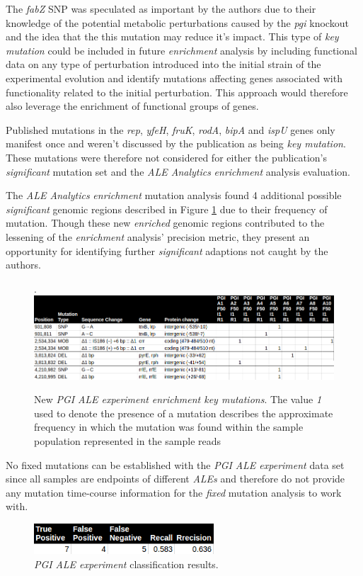 \documentclass[12pt,final,masters,chapterheads]{ucsd}  %
\begin{document}
The \textit{fabZ} SNP was speculated as important by the authors due to their knowledge of the potential metabolic perturbations caused by the \textit{pgi} knockout and the idea that the this mutation may reduce it's impact. This type of \textit{key mutation} could be included in future \textit{enrichment} analysis by including functional data on any type of perturbation introduced into the initial strain of the experimental evolution and identify mutations affecting genes associated with functionality related to the initial perturbation. This approach would therefore also leverage the enrichment of functional groups of genes.

Published mutations in the \textit{rep}, \textit{yfeH}, \textit{fruK}, \textit{rodA}, \textit{bipA} and \textit{ispU} genes only manifest once and weren't discussed by the publication as being \textit{key mutation}. These mutations were therefore not considered for either the publication's \textit{significant} mutation set and the \textit{ALE Analytics} \textit{enrichment} analysis evaluation.

The \textit{ALE Analytics} \textit{enrichment} mutation analysis found 4 additional possible \textit{significant} genomic regions described in Figure \ref{fig:pgi_new_enrichment_muts} due to their frequency of mutation. Though these new \textit{enriched} genomic regions contributed to the lessening of the \textit{enrichment} analysis' precision metric, they present an opportunity for identifying further \textit{significant} adaptions not caught by the authors.
\begin{figure}[H]
  \caption{New \textit{PGI} \textit{ALE experiment} \textit{enrichment key mutations}. The value \textit{1} used to denote the presence of a mutation describes the approximate frequency in which the mutation was found within the sample population represented in the sample reads \cite{breseq_paper}}.
  \centering
  \includegraphics[width=\textwidth]{pgi_new_enrichment_muts.png}
  \label{fig:pgi_new_enrichment_muts}
\end{figure}
No fixed mutations can be established with the \textit{PGI} \textit{ALE experiment} data set since all samples are endpoints of different \textit{ALEs} and therefore do not provide any mutation time-course information for the \textit{fixed} mutation analysis to work with.
\begin{figure}[H]
  \centering
  \caption{\textit{PGI} \textit{ALE experiment} classification results.}
  \includegraphics[width=0.6\textwidth]{pgi_precision_recall.png}
\end{figure}
\end{document}
